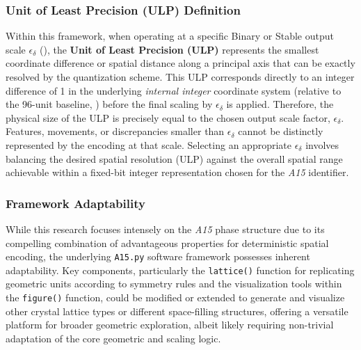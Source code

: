 \documentclass[10pt]{article}
\def\AAAB{\textit{A15}}
\begin{document}
\subsubsection{Unit of Least Precision (ULP) Definition}\label{subsubsec-notes-ulp}
Within this framework, when operating at a specific Binary or Stable output scale $\epsilon_\delta$ (), the \textbf{Unit of Least Precision (ULP)} represents the smallest coordinate difference or spatial distance along a principal axis that can be exactly resolved by the quantization scheme. This ULP corresponds directly to an integer difference of \num{1} in the underlying \emph{internal integer} coordinate system (relative to the 96-unit baseline, ) before the final scaling by $\epsilon_\delta$ is applied. Therefore, the physical size of the ULP is precisely equal to the chosen output scale factor, $\epsilon_\delta$. Features, movements, or discrepancies smaller than $\epsilon_\delta$ cannot be distinctly represented by the encoding at that scale. Selecting an appropriate $\epsilon_\delta$ involves balancing the desired spatial resolution (ULP) against the overall spatial range achievable within a fixed-bit integer representation chosen for the \AAAB{} identifier.

\subsubsection{Framework Adaptability}\label{subsubsec-notes-adaptability}
While this research focuses intensely on the \AAAB{} phase structure due to its compelling combination of advantageous properties for deterministic spatial encoding, the underlying \texttt{A15.py} software framework possesses inherent adaptability. Key components, particularly the \texttt{lattice()} function for replicating geometric units according to symmetry rules and the visualization tools within the \texttt{figure()} function, could be modified or extended to generate and visualize other crystal lattice types or different space-filling structures, offering a versatile platform for broader geometric exploration, albeit likely requiring non-trivial adaptation of the core geometric and scaling logic.
\end{document}

